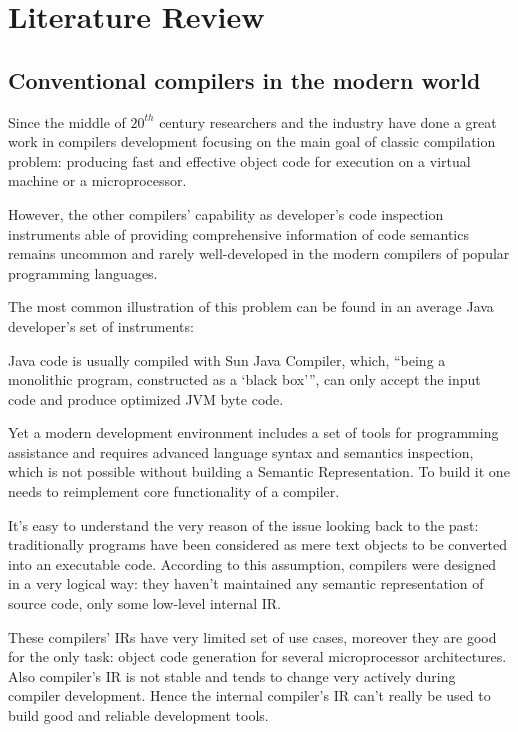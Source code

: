 \chapter{Literature Review}
\label{chap:lr}

\section{Conventional compilers in the modern world}
\label{sec:review_1}

Since the middle of $20^{th}$ century researchers and the industry have done a great
work in compilers development focusing on the main goal of classic compilation
problem: producing fast and effective object code for execution on a virtual
machine or a microprocessor.


However, the other compilers’ capability as developer’s code inspection
instruments able of providing comprehensive information of code semantics
remains uncommon and rarely well-developed in the modern compilers of
popular programming languages.


The most common illustration of this problem can be found in an average Java
developer’s set of instruments:

Java code is usually compiled with Sun Java Compiler, which, “being a
monolithic program, constructed as a ‘black box’”\cite{Zouev2005}, can only accept the input
code and produce optimized JVM byte code.


Yet a modern development environment includes a set of tools for
programming assistance and requires advanced language syntax and
semantics inspection, which is not possible without building a Semantic
Representation\cite{Zouev2005}. To build it one needs to reimplement core functionality of a
compiler.


It’s easy to understand the very reason of the issue looking back to the past:
traditionally programs have been considered as mere text objects to be
converted into an executable code. According to this assumption, compilers
were designed in a very logical way: they haven’t maintained any semantic
representation of source code, only some low-level internal IR.


These compilers’ IRs have very limited set of use cases\cite{Zouev2005, Zouev2010}, moreover they are
good for the only task: object code generation for several microprocessor
architectures. Also compiler’s IR is not stable and tends to change very actively
during compiler development\cite{FreeSoftwareFoundation2016}. Hence the internal compiler’s IR can’t really
be used to build good and reliable development tools.


